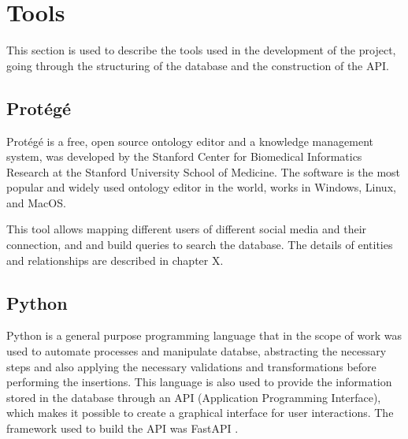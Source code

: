\chapter{Tools}

This section is used to describe the tools used in the development of the project, going through the structuring of the database and the construction of the API.

\section{Protégé}

Protégé \cite{protege} is a free, open source ontology editor and a knowledge management system, was developed by the Stanford Center for Biomedical Informatics Research at the Stanford University School of Medicine. The software is the most popular and widely used ontology editor in the world, works in Windows, Linux, and MacOS.

This tool allows mapping different users of different social media and their connection, and and build queries to search the database. The details of entities and relationships are described in chapter X.

\section{Python}
Python \cite{python} is a general purpose programming language that in the scope of work was used to automate processes and manipulate databse, abstracting the necessary steps and also applying the necessary validations and transformations before performing the insertions. 
This language is also used to provide the information stored in the database through an API (Application Programming Interface), which makes it possible to create a graphical interface for user interactions. The framework used to build the API was FastAPI \cite{fastapi}.


